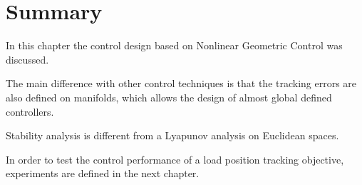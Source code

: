 \section*{Summary}

In this chapter the control design based on Nonlinear Geometric Control was discussed.

The main difference with other control techniques is that the tracking errors are also defined on manifolds, which allows the design of almost global defined controllers.

Stability analysis is different from a Lyapunov analysis on Euclidean spaces.


In order to test the control performance of a load position tracking objective, experiments are defined in the next chapter. 




